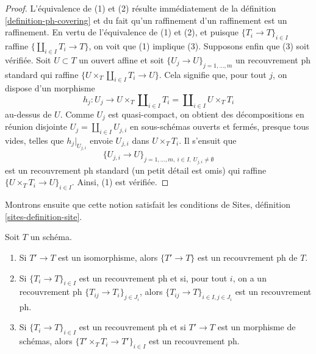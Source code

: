 \begin{proof}
L'équivalence de (1) et (2) résulte immédiatement de la
définition \ref{definition-ph-covering}
et du fait qu'un raffinement d'un raffinement est un raffinement.
En vertu de l'équivalence de (1) et (2), et puisque
$\{T_i \to T\}_{i \in I}$ raffine $\{\coprod_{i \in I} T_i \to T\}$,
on voit que (1) implique (3). Supposons enfin que (3) soit vérifiée.
Soit $U \subset T$ un ouvert affine et soit
$\{U_j \to U\}_{j = 1, \ldots, m}$ un recouvrement ph standard
qui raffine $\{U \times_T \coprod_{i \in I} T_i \to U\}$.
Cela signifie que, pour tout $j$, on dispose d'un morphisme
$$
h_j :
U_j
\longrightarrow
U \times_T \coprod\nolimits_{i \in I} T_i =
\coprod\nolimits_{i \in I} U \times_T T_i
$$
au-dessus de $U$. Comme $U_j$ est quasi-compact, on obtient
des décompositions en réunion disjointe $U_j = \coprod_{i \in I} U_{j, i}$
en sous-schémas ouverts et fermés, presque tous vides,
telles que $h_j|_{U_{j, i}}$ envoie $U_{j, i}$ dans $U \times_T T_i$.
Il s'ensuit que
$$
\{U_{j, i} \to U\}_{j = 1, \ldots, m,\ i \in I,\ U_{j, i} \not = \emptyset}
$$
est un recouvrement ph standard (un petit détail est omis) qui raffine
$\{U \times_T T_i \to U\}_{i \in I}$. Ainsi, (1) est vérifiée.
\end{proof}

\noindent
Montrons ensuite que cette notion satisfait les conditions de
Sites, définition \ref{sites-definition-site}.

\begin{lemma}
\label{lemma-ph}
Soit $T$ un schéma.
\begin{enumerate}
\item Si $T' \to T$ est un isomorphisme, alors $\{T' \to T\}$
est un recouvrement ph de $T$.
\item Si $\{T_i \to T\}_{i\in I}$ est un recouvrement ph et si, pour tout
$i$, on a un recouvrement ph $\{T_{ij} \to T_i\}_{j\in J_i}$, alors
$\{T_{ij} \to T\}_{i \in I, j\in J_i}$ est un recouvrement ph.
\item Si $\{T_i \to T\}_{i\in I}$ est un recouvrement ph
et si $T' \to T$ est un morphisme de schémas, alors
$\{T' \times_T T_i \to T'\}_{i\in I}$ est un recouvrement ph.
\end{enumerate}
\end{lemma}

